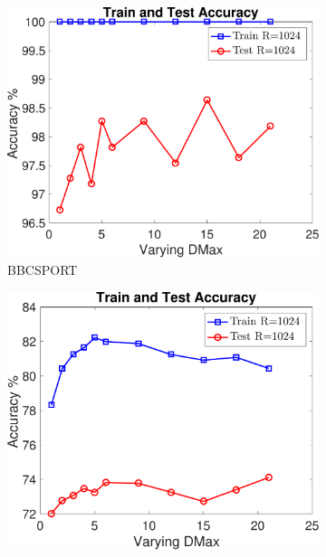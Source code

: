 \documentclass[11pt,a4paper]{article}
\newcommand{\1}{\boldsymbol{1}}
\begin{document}
\begin{figure}[htb]
\centering
  		\begin{subfigure}[b]{0.23\textwidth}
      \includegraphics[width=\textwidth]{Graphs/wmdk_varyingD/bbcsport_Accu_VaryingD_CV_R1024_dataSplit1-eps-converted-to.pdf}
      \caption{BBCSPORT}
      \label{App:fig:exptsA_varyingD_bbcsport}
     	\end{subfigure}
		\begin{subfigure}[b]{0.23\textwidth}
      \includegraphics[width=\textwidth]{Graphs/wmdk_varyingD/twitter_Accu_VaryingD_CV_R1024_dataSplit1-eps-converted-to.pdf}

\end{subfigure}
\end{figure}
\end{document}
